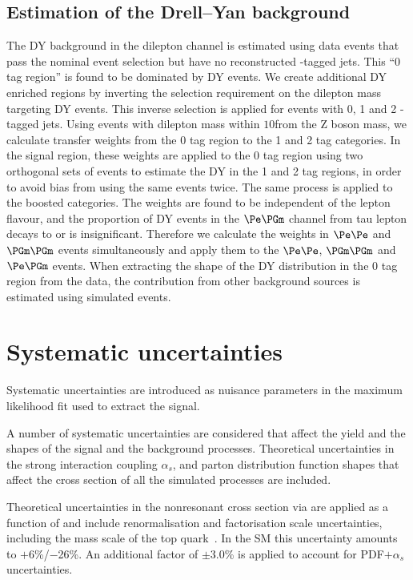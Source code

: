 \subsection{Estimation of the Drell--Yan background}
\label{sec:backgroundEstimation_DY}
The DY background in the dilepton channel is estimated using data events that pass the nominal event selection but have no reconstructed \Pbottom-tagged jets.
This ``0 \Pbottom tag region'' is found to be dominated by DY events.
We create additional DY enriched regions by inverting the selection requirement on the dilepton mass targeting DY events.
This inverse selection is applied for events with 0, 1 and 2 \Pbottom-tagged jets.
Using events with dilepton mass within $10$\GeV from the Z boson mass, we calculate transfer weights from the 0 \Pbottom tag region to the 1 and 2 \Pbottom tag categories.
In the signal region, these weights are applied to the 0 \Pbottom tag region using two orthogonal sets of events to estimate the DY in the 1 and 2 \Pbottom tag regions, in order to avoid bias from using the same events twice.
The same process is applied to the boosted categories.
The weights are found to be independent of the lepton flavour, and the proportion of DY events in the $\Pe\PGm$ channel from tau lepton decays to \Pe or \PGm is insignificant.
Therefore we calculate the weights in $\Pe\Pe$ and $\PGm\PGm$ events simultaneously and apply them to the $\Pe\Pe$, $\PGm\PGm$ and $\Pe\PGm$ events.
When extracting the shape of the DY distribution in the 0 \Pbottom tag region from the data, the contribution from other background sources is estimated using simulated events.
\section{Systematic uncertainties}
\label{systematics}
Systematic uncertainties are introduced as nuisance parameters in the maximum likelihood fit used to extract the signal.

A number of systematic uncertainties are considered that affect the yield and the shapes of the \HH signal and the background processes.
Theoretical uncertainties in the strong interaction coupling $\alpha_s$, and parton distribution function shapes that affect the cross section of all the simulated processes are included.

Theoretical uncertainties in the nonresonant \HH cross section via \GGF are applied as a function of \klambda
and include renormalisation and factorisation scale uncertainties, including the mass scale of the top quark~\cite{Baglio:2020wgt}. In the SM this uncertainty amounts to $+$6\%/$-$26\%. An additional factor of $\pm$3.0\% is applied to account for PDF$+\alpha_s$ uncertainties.

